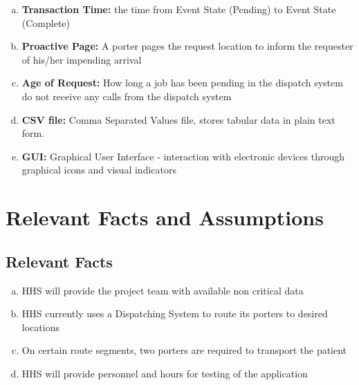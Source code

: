 \documentclass[paper=letter, fontsize=10pt]{scrartcl}
\numberwithin{equation}{section}		%
\numberwithin{figure}{section}			%
\numberwithin{table}{section}				%
\begin{document}
\begin{enumerate}[(a)]
\begin{enumerate}[(i)]
	\end{enumerate} 
	\item \textbf{Transaction Time:} the time from Event State (Pending) to Event State (Complete)
	\item \textbf{Proactive Page:} A porter pages the request location to inform the requester of his/her impending arrival      
	\item \textbf{Age of Request:} How long a job has been pending in the dispatch system
	 do not receive any calls from the dispatch system
	\item \textbf{CSV file:} Comma Separated Values file, stores tabular data in plain text form. 
	\item \textbf{GUI:} Graphical User Interface - interaction with electronic devices through graphical icons and visual indicators
\end{enumerate}

\section{Relevant Facts and Assumptions}
\subsection{Relevant Facts}
\begin{enumerate}[(a)]
	\item HHS will provide the project team with available non critical data
	\item HHS currently uses a Dispatching System to route its porters to desired locations
	\item On certain route segments, two porters are required to transport the patient 
	\item HHS will provide personnel and hours for testing of the application
\end{enumerate}
\end{document}
